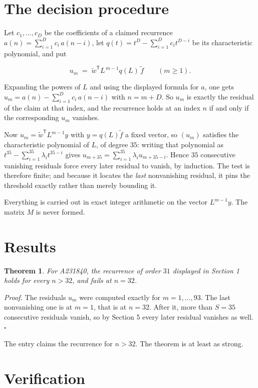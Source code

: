 \documentclass[11pt]{article}
\newtheorem{theorem}{Theorem}
\theoremstyle{definition}
\begin{document}
\section{The decision procedure}

Let $c_1,\dots,c_D$ be the coefficients of a claimed recurrence $a(n) = \sum_{i=1}^{D} c_i\,a(n-i)$, let $q(t) = t^{D} - \sum_{i=1}^{D} c_i t^{D-i}$ be its characteristic polynomial, and put

\[u_m \;=\; \tilde w^{\mathsf T} L^{\,m-1} q(L)\,\tilde f \qquad (m \ge 1).\]

Expanding the powers of $L$ and using the displayed formula for $a$, one gets $u_m = a(n) - \sum_{i=1}^{D} c_i\,a(n-i)$ with $n = m + D$. So $u_m$ is exactly the residual of the claim at that index, and the recurrence holds at an index $n$ if and only if the corresponding $u_m$ vanishes.

Now $u_m = \tilde w^{\mathsf T} L^{m-1} y$ with $y = q(L)\tilde f$ a fixed vector, so $(u_m)$ satisfies the characteristic polynomial of $L$, of degree $35$: writing that polynomial as $t^{35} - \sum_{i=1}^{35} \lambda_i t^{35-i}$ gives $u_{m+35} = \sum_{i=1}^{35} \lambda_i u_{m+35-i}$. Hence $35$ consecutive vanishing residuals force every later residual to vanish, by induction. The test is therefore finite; and because it locates the {\itshape last} nonvanishing residual, it pins the threshold exactly rather than merely bounding it.

Everything is carried out in exact integer arithmetic on the vector $L^{m-1}y$. The matrix $M$ is never formed.

\section{Results}

\begin{theorem} For A231840, the recurrence of order $31$ displayed in Section 1 holds for every $n > 32$, and fails at $n = 32$.\end{theorem}

{\itshape Proof.} The residuals $u_m$ were computed exactly for $m = 1,\dots,93$. The last nonvanishing one is at $m = 1$, that is at $n = 32$. After it, more than $S = 35$ consecutive residuals vanish, so by Section 5 every later residual vanishes as well. $\square$

The entry claims the recurrence for $n > 32$. The theorem is at least as strong.

\section{Verification}
\end{document}
